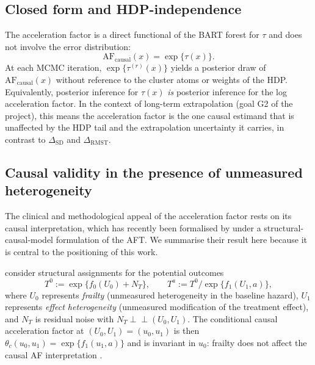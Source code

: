 \documentclass[11pt]{article}
\newcommand{\tauf}{\tau}
\newcommand{\RMST}{\mathrm{RMST}}
\newcommand{\SD}{\mathrm{SD}}
\newcommand{\AF}{\mathrm{AF}}
\begin{document}
\subsection{Closed form and HDP-independence}

The acceleration factor is a direct functional of the BART forest for
$\tauf$ and does not involve the error distribution:
\begin{equation}
  \boxed{\;\AF_{\mathrm{causal}}(x) = \exp\{\tauf(x)\}.\;}
\end{equation}
At each MCMC iteration, $\exp\{\tauf^{(r)}(x)\}$ yields a posterior draw of
$\AF_{\mathrm{causal}}(x)$ without reference to the cluster atoms or
weights of the HDP. Equivalently, posterior inference for $\tauf(x)$
\emph{is} posterior inference for the log acceleration factor. In the
context of long-term extrapolation (goal G2 of the project), this means
the acceleration factor is the one causal estimand that is unaffected by
the HDP tail and the extrapolation uncertainty it carries, in contrast to
$\Delta_{\SD}$ and $\Delta_{\RMST}$.

\subsection{Causal validity in the presence of unmeasured heterogeneity}
\label{subsec:af-causal-validity}

The clinical and methodological appeal of the acceleration factor rests on
its causal interpretation, which has recently been formalised by
\citet{Brathovde2024} under a structural-causal-model formulation of the
AFT. We summarise their result here because it is central to the
positioning of this work.

\citet{Brathovde2024} consider structural assignments for the potential
outcomes
\begin{equation}
  T^{0} := \exp\{f_{0}(U_{0}) + N_{T}\}, \qquad
  T^{a} := T^{0}/\exp\{f_{1}(U_{1}, a)\},
  \label{eq:scm}
\end{equation}
where $U_{0}$ represents \emph{frailty} (unmeasured heterogeneity in the
baseline hazard), $U_{1}$ represents \emph{effect heterogeneity}
(unmeasured modification of the treatment effect), and $N_{T}$ is residual
noise with $N_{T} \perp\!\!\!\perp (U_{0}, U_{1})$. The conditional causal
acceleration factor at $(U_{0}, U_{1}) = (u_{0}, u_{1})$ is then
$\theta_{c}(u_{0}, u_{1}) = \exp\{f_{1}(u_{1}, a)\}$ and is invariant in
$u_{0}$: frailty does not affect the causal AF interpretation
\citep{Keiding1997, Aalen2015}.
\end{document}
